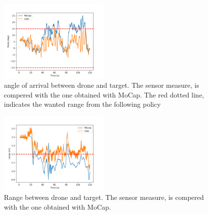 \begin{figure}
    \centering
    \includegraphics[width=0.48\textwidth]{images/real_test/aoa_Uwb_Mocap.png}
    \caption{angle of arrival between drone and target. The sensor measure, is compered with the one obtained with MoCap. The red dotted line, indicates the wanted range from the following policy}
    \label{REAL:fig:aoa}
\end{figure}

\begin{figure}
    \centering
    \includegraphics[width=0.48\textwidth]{images/real_test/range_Uwb_Mocap.png}
    \caption{Range between drone and target. The sensor measure, is compered with the one obtained with MoCap.}
    \label{REAL:fig:range}
\end{figure}

